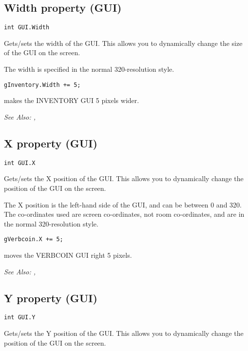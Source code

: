 \subsection{Width property (GUI)}\label{GUI.Width}%

\begin{verbatim}
int GUI.Width
\end{verbatim}
Gets/sets the width of the GUI. This allows you to dynamically change the size
of the GUI on the screen.

The width is specified in the normal 320-resolution style.

\begin{verbatim}
gInventory.Width += 5;
\end{verbatim}

makes the INVENTORY GUI 5 pixels wider.

\it{See Also:} , 


\subsection{X property (GUI)}\label{GUI.X}%

\begin{verbatim}
int GUI.X
\end{verbatim}
Gets/sets the X position of the GUI. This allows you to dynamically change the position
of the GUI on the screen.

The X position is the left-hand side of the GUI, and can be between 0 and 320. The
co-ordinates used are screen co-ordinates, not room co-ordinates, and are in the normal
320-resolution style.

\begin{verbatim}
gVerbcoin.X += 5;
\end{verbatim}

moves the VERBCOIN GUI right 5 pixels.

\it{See Also:} , 


\subsection{Y property (GUI)}\label{GUI.Y}%

\begin{verbatim}
int GUI.Y
\end{verbatim}
Gets/sets the Y position of the GUI. This allows you to dynamically change the position
of the GUI on the screen.

